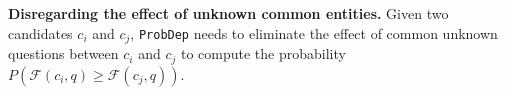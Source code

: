\begin{comment}
\begin{center}
$Dict(c_1) = \{c_2 = 3.5, c_2 = 4\}$.    
\end{center}


Since each $c_1$ and $c_2$ have 5 possible values, there are $25$ different combinations between them, and since there are 6 edges or equivalently, there are totally 6 values for all keys/nodes in $c_1$, it means 6 of them satisfy $c_2 \geq c_1$. Hence, we could conclude that: \(\mathbf{P(c_2 \geq c_1)} = \frac{6}{25}\). However, one important challenge in calculating these probabilities precisely involves disregarding the effect of unknown common elements between candidates in the final probability value.

\textcolor{red}{ pl be careful with notations. you were using c1, $c_1$, $c_i,$, $c_j$, very inconsistently....I cant fix all of these}

\end{comment}

\textbf{Disregarding the effect of unknown common entities.} Given two candidates $c_i$ and $c_j$, {\tt ProbDep} needs to eliminate the effect of common unknown questions between $c_i$ and $c_j$ to compute the probability $P(\mathcal{F}(c_i, q) \geq \mathcal{F}(c_j, q))$. 


